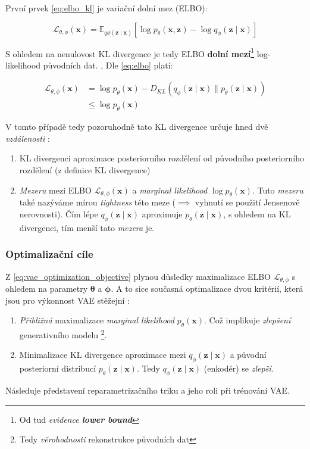První prvek \autoref{eq:elbo_kl} je variační dolní mez (ELBO):

\begin{equation} \label{eq:elbo}
    \mathcal{L}_{\theta,\phi}(\textbf{x}) = \mathds{E}_{q\phi(\textbf{z}\mid\textbf{x})}[\log p_\theta(\textbf{x},\textbf{z}) - \log q_\phi(\textbf{z}\mid\textbf{x})]
\end{equation}

S ohledem na nenulovost KL divergence je tedy ELBO \textbf{dolní mezí}\footnote{Od tud \emph{evidence \textbf{lower bound}}} log-likelihood původních dat. \cite{Kingma2014}, \cite{Goodfellow2016}
Dle \autoref{eq:elbo} platí:

\begin{align}
    \mathcal{L}_{\theta,\phi}(\textbf{x}) &= \log p_\theta(\textbf{x}) - D_{KL}(q_\phi(\textbf{z}\mid\textbf{x})\parallel p_\theta(\textbf{z}\mid\textbf{x})) \\ \label{eq:vae_optimization_objective}
                                          &\leq \log p_\theta(\textbf{x})
\end{align}

V tomto případě tedy pozoruhodně tato KL divergence určuje hned dvě \emph{vzdálenosti} \cite{Kingma2019}:
\begin{enumerate}
    \item KL divergenci aproximace posteriorního rozdělení od původního posteriorního rozdělení (z definice KL divergence)
    \item \emph{Mezeru} mezi ELBO $\mathcal{L}_{\theta,\phi}(\textbf{x})$ a \emph{marginal likelihood} $\log p_\theta(\textbf{x})$. Tuto \emph{mezeru} také nazýváme mírou \emph{tightness} této meze ($\implies$ vyhnutí se použití Jensenově nerovnosti). Čím lépe $q_\phi(\textbf{z}\mid\textbf{x})$ aproximuje $p_\theta(\textbf{z}\mid\textbf{x})$, s ohledem na KL divergenci, tím menší tato \emph{mezera} je.
\end{enumerate}

\subsubsection{Optimalizační cíle}
Z \autoref{eq:vae_optimization_objective} plynou důsledky maximalizace ELBO $\mathcal{L_{\theta,\phi}}$ s ohledem na parametry $\boldsymbol{\theta}$ a $\boldsymbol{\phi}$.
A to sice současná optimalizace dvou kritérií, která jsou pro výkonnost VAE stěžejní \cite{Kingma2019}:

\begin{enumerate}
    \item \emph{Přibližná} maximalizace \emph{marginal likelihood} $p_\theta(\textbf{x})$. Což implikuje \emph{zlepšení} generativního modelu \footnote{Tedy \emph{věrohodnosti} rekonstrukce původních dat}.
    \item Minimalizace KL divergence aproximace mezi $q_\phi(\textbf{z}\mid\textbf{x})$ a původní posteriorní distribucí $p_\theta(\textbf{z}\mid\textbf{x})$. Tedy $q_\phi(\textbf{z}\mid\textbf{x})$ (enkodér) se \emph{zlepší}.
\end{enumerate}



Následuje představení reparametrizačního triku a jeho roli při trénování VAE.